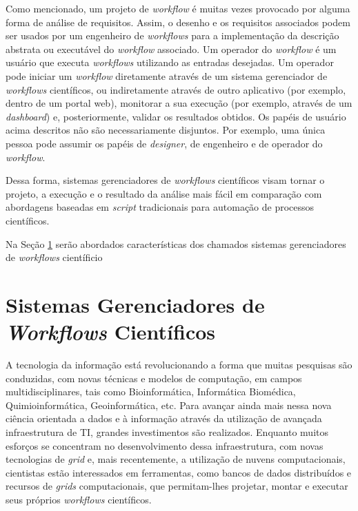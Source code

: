 Como mencionado, um projeto de \textit{workflow} é muitas vezes provocado por alguma forma de análise de requisitos. Assim, o desenho e os requisitos associados podem ser usados por um engenheiro de \textit{workflows} para a implementação da descrição abstrata ou executável do \textit{workflow} associado. Um operador do \textit{workflow} é um usuário que executa \textit{workflows} utilizando as entradas desejadas. Um operador pode iniciar um \textit{workflow} diretamente através de um sistema gerenciador de \textit{workflows} científicos, ou indiretamente através de outro aplicativo (por exemplo, dentro de um portal web), monitorar a sua execução (por exemplo, através de um \textit{dashboard}) e, posteriormente, validar os resultados obtidos. Os papéis de usuário acima descritos não são necessariamente disjuntos. Por exemplo, uma única pessoa pode assumir os papéis de \textit{designer}, de engenheiro e de operador do \textit{workflow}. 

Dessa forma, sistemas gerenciadores de \textit{workflows} científicos visam tornar o projeto, a execução e o resultado da análise mais fácil em comparação com abordagens baseadas em \textit{script} tradicionais para automação de processos científicos.

Na Seção \ref{cap3sec3} serão abordados características dos chamados sistemas gerenciadores de \textit{workflows} científicio

\section{Sistemas Gerenciadores de \textit{Workflows} Científicos} \label{cap3sec3}

A tecnologia da informação está revolucionando a forma que muitas pesquisas são conduzidas, com novas técnicas e modelos de computação, em campos multidisciplinares, tais como Bioinformática, Informática Biomédica, Quimioinformática, Geoinformática, etc. Para avançar ainda mais nessa nova ciência orientada a dados e à informação através da utilização de avançada infraestrutura de TI, grandes investimentos são realizados. Enquanto muitos esforços se concentram no desenvolvimento dessa infraestrutura, com novas tecnologias de \textit{grid} e, mais recentemente, a utilização de nuvens computacionais, cientistas estão interessados em ferramentas, como bancos de dados distribuídos e recursos de \textit{grids} computacionais, que permitam-lhes projetar, montar e executar seus próprios \textit{workflows} científicos. 


